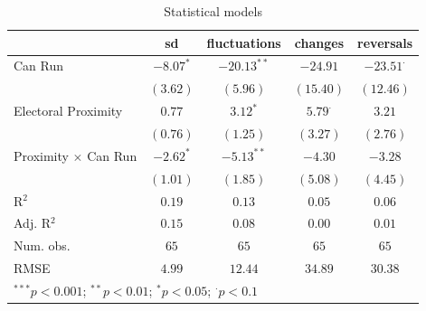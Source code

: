 
\begin{table}
\begin{center}
\begin{tabular}{l c c c c}
\hline
 & sd & fluctuations & changes & reversals \\
\hline
Can Run                    & $-8.07^{*}$ & $-20.13^{**}$ & $-24.91$       & $-23.51^{\cdot}$ \\
                           & $(3.62)$    & $(5.96)$      & $(15.40)$      & $(12.46)$        \\
Electoral Proximity        & $0.77$      & $3.12^{*}$    & $5.79^{\cdot}$ & $3.21$           \\
                           & $(0.76)$    & $(1.25)$      & $(3.27)$       & $(2.76)$         \\
Proximity $\times$ Can Run & $-2.62^{*}$ & $-5.13^{**}$  & $-4.30$        & $-3.28$          \\
                           & $(1.01)$    & $(1.85)$      & $(5.08)$       & $(4.45)$         \\
\hline
R$^2$                      & $0.19$      & $0.13$        & $0.05$         & $0.06$           \\
Adj. R$^2$                 & $0.15$      & $0.08$        & $0.00$         & $0.01$           \\
Num. obs.                  & $65$        & $65$          & $65$           & $65$             \\
RMSE                       & $4.99$      & $12.44$       & $34.89$        & $30.38$          \\
\hline
\multicolumn{5}{l}{\scriptsize{$^{***}p<0.001$; $^{**}p<0.01$; $^{*}p<0.05$; $^{\cdot}p<0.1$}}
\end{tabular}
\caption{Statistical models}
\label{table:coefficients:policy}
\end{center}
\end{table}

